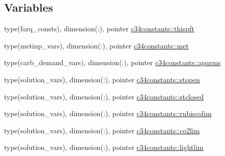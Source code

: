 \subsection*{Variables}
\begin{DoxyCompactItemize}
\item 
type(farq\+\_\+consts), dimension(\+:), pointer \hyperlink{namespacec34constants_a4a1314df0becf145f8a2365aa27d992d}{c34constants\+::thispft}
\item 
type(metinp\+\_\+vars), dimension(\+:), pointer \hyperlink{namespacec34constants_a6d1c98b7c360f24d485be8fc38bdd284}{c34constants\+::met}
\item 
type(carb\+\_\+demand\+\_\+vars), dimension(\+:), pointer \hyperlink{namespacec34constants_a844bf4288f019d9dcee7612f54d1e50c}{c34constants\+::aparms}
\item 
type(solution\+\_\+vars), dimension(\+:), pointer \hyperlink{namespacec34constants_a5affd928720d3a40f01f1198b68b7fb3}{c34constants\+::stopen}
\item 
type(solution\+\_\+vars), dimension(\+:), pointer \hyperlink{namespacec34constants_a083891d928147a7252ada72b49b240a3}{c34constants\+::stclosed}
\item 
type(solution\+\_\+vars), dimension(\+:), pointer \hyperlink{namespacec34constants_a54cb2e4894b639d22e50b457b4208cfc}{c34constants\+::rubiscolim}
\item 
type(solution\+\_\+vars), dimension(\+:), pointer \hyperlink{namespacec34constants_abed7f7ff7745473ac53005a45206f506}{c34constants\+::co2lim}
\item 
type(solution\+\_\+vars), dimension(\+:), pointer \hyperlink{namespacec34constants_af66eea644957075da5a5285e735e143b}{c34constants\+::lightlim}
\end{DoxyCompactItemize}
